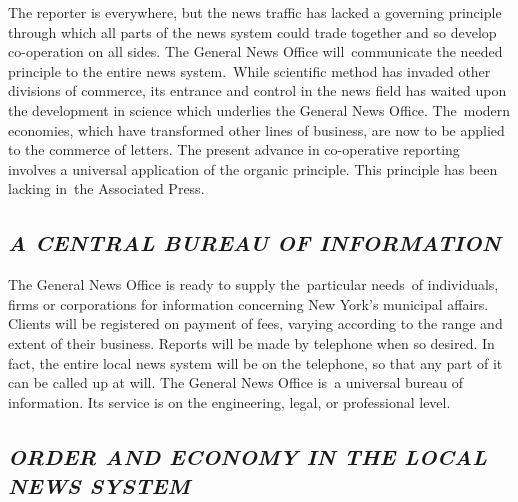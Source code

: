\documentclass[openany,nobib]{tufte-book}
\begin{document}
The reporter is everywhere, but the news traffic has lacked a governing
principle through which all parts of the news system could trade
together and so develop co-operation on all sides. The General News
Office will~communicate the needed principle to the entire news
system.~While scientific method has invaded other divisions of commerce,
its entrance and control in the news field has waited upon the
development in science which underlies the General News Office.
The~modern economies, which have transformed other lines of business,
are now to be applied to the commerce of letters. The present advance in
co-operative reporting involves a universal application of the organic
principle. This principle has been lacking in~the Associated Press.~

\hypertarget{a-central-bureau-of-information}{%
\subsection{\emph{A CENTRAL BUREAU OF
INFORMATION}}\label{a-central-bureau-of-information}}

The General News Office is ready to supply the~particular needs~of
individuals, firms or corporations for information concerning New York's
municipal affairs. Clients will be registered on payment of fees,
varying according to the range and extent of their business. Reports
will be made by telephone when so desired. In fact, the entire local
news system will be on the telephone, so that any part of it can be
called up at will. The General News Office is~a universal bureau of
information. Its service is on the engineering, legal, or professional
level.~

\hypertarget{order-and-economy-in-the-local-news-system}{%
\subsection{\emph{ORDER AND ECONOMY IN THE LOCAL NEWS
SYSTEM}}\label{order-and-economy-in-the-local-news-system}}
\end{document}
